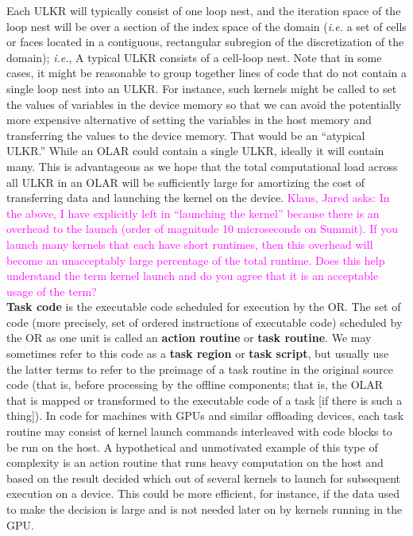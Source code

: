 \documentclass{article}
\newcommand{\ie}{\textit{i.e.}}   %
\newcommand{\KlausQfromJO}[1]   {\textcolor{magenta}{Klaus, Jared asks: #1}}
\newcommand{\shortULKR}  {ULKR\xspace}
\newcommand{\shortOLAR}  {OLAR\xspace}
\newcommand{\shortOR}   {OR\xspace}
\newcommand{\ULKR}   {\shortULKR}
\newcommand{\OLAR}   {\shortOLAR}             %
\newcommand{\OR}        {\shortOR}
\newcommand{\cellloopnest}           {cell-loop nest\xspace}    %
\newcommand{\taskroutine}        {task routine\xspace}
\newcommand{\actionroutine}        {action routine\xspace}       %
\newcommand{\GPGPUs}       {GPUs\xspace}
\begin{document}
Each \ULKR will typically consist of one loop nest, and the iteration space of
the loop nest will be over a section of the index space of the domain
(\textit{i.e.} a set of cells or faces located in a contiguous, rectangular
subregion of the discretization of the domain); \ie, A typical \ULKR consists of a
\cellloopnest.  Note that in some cases, it might be reasonable to group
together lines of code that do not contain a single loop nest into an \ULKR.
For instance, such kernels might be called to set the values of variables in the
device memory so that we can avoid the potentially more expensive alternative of
setting the variables in the host memory and transferring the values to the
device memory. That would be an ``atypical \ULKR.''  While an \OLAR could
contain a single \ULKR, ideally it will contain many.  This is advantageous as
we hope that the total computational load across all \ULKR in an \OLAR will be
sufficiently large for amortizing the cost of transferring data and launching
the kernel on the device.  \KlausQfromJO{In the above, I have explicitly left in
``launching the kernel'' because there is an overhead to the launch (order of
magnitude 10 microseconds on Summit).  If you launch many kernels that each have
short runtimes, then this overhead will become an unacceptably large percentage
of the total runtime.  Does this help understand the term kernel launch and do
you agree that it is an acceptable usage of the term?}\\

\textbf{Task code} is the executable code scheduled for execution by the \OR.
The set of code (more precisely, set of ordered instructions of executable code)
scheduled by the \OR as one unit is called an \textbf{\actionroutine} or
\textbf{task routine}.  We may sometimes refer to this code as a \textbf{task
region} or \textbf{task script}, but usually use the latter terms to refer to
the preimage of a task routine in the original source code (that is, before
processing by the offline components; that is, the OLAR that is mapped or
transformed to the executable code of a task [if there is such a thing]).  In
code for machines with \GPGPUs and similar offloading devices, each \taskroutine
may consist of kernel launch commands interleaved with code blocks to be run on
the host.  A hypothetical and unmotivated example of this type of complexity is
an action routine that runs heavy computation on the host and based on the
result decided which out of several kernels to launch for subsequent execution
on a device.  This could be more efficient, for instance, if the data used to
make the decision is large and is not needed later on by kernels running in the
GPU.\\
\end{document}
